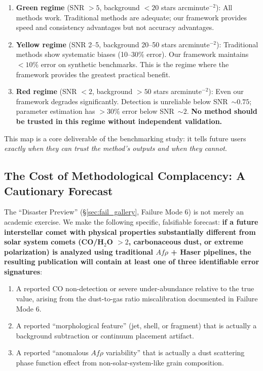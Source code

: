 \documentclass[preprint2]{aastex631}
\begin{document}
\begin{enumerate}
    \item \textbf{Green regime} (SNR $>5$, background $<20$ stars arcminute$^{-2}$): All methods work. Traditional methods are adequate; our framework provides speed and consistency advantages but not accuracy advantages.
    \item \textbf{Yellow regime} (SNR 2--5, background 20--50 stars arcminute$^{-2}$): Traditional methods show systematic biases (10--30\% error). Our framework maintains $<10\%$ error on synthetic benchmarks. This is the regime where the framework provides the greatest practical benefit.
    \item \textbf{Red regime} (SNR $<2$, background $>50$ stars arcminute$^{-2}$): Even our framework degrades significantly. Detection is unreliable below SNR~$\sim 0.75$; parameter estimation has $>30\%$ error below SNR~$\sim 2$. \textbf{No method should be trusted in this regime without independent validation.}
\end{enumerate}

This map is a core deliverable of the benchmarking study: it tells future users \textit{exactly when they can trust the method's outputs and when they cannot}.

\subsection{The Cost of Methodological Complacency: A Cautionary Forecast}

The ``Disaster Preview'' (\S\ref{sec:fail_gallery}, Failure Mode 6) is not merely an academic exercise. We make the following specific, falsifiable forecast: \textbf{if a future interstellar comet with physical properties substantially different from solar system comets (CO/H$_2$O $> 2$, carbonaceous dust, or extreme polarization) is analyzed using traditional $Af\rho$ + Haser pipelines, the resulting publication will contain at least one of three identifiable error signatures}:

\begin{enumerate}
    \item A reported CO non-detection or severe under-abundance relative to the true value, arising from the dust-to-gas ratio miscalibration documented in Failure Mode 6.
    \item A reported ``morphological feature'' (jet, shell, or fragment) that is actually a background subtraction or continuum placement artifact.
    \item A reported ``anomalous $Af\rho$ variability'' that is actually a dust scattering phase function effect from non-solar-system-like grain composition.
\end{enumerate}
\end{document}
